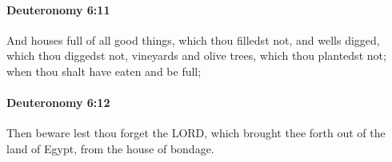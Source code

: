 		\paragraph{Deuteronomy 6:11} %
			\label{DEUTERONOMY-6-11}

			And houses full of all good things, which thou filledst not, and wells digged, which thou diggedst not, vineyards and olive trees, which thou plantedst not; when thou shalt have eaten and be full;


		\paragraph{Deuteronomy 6:12} %
			\label{DEUTERONOMY-6-12}

			Then beware lest thou forget the LORD, which brought thee forth out of the land of Egypt, from the house of bondage.


